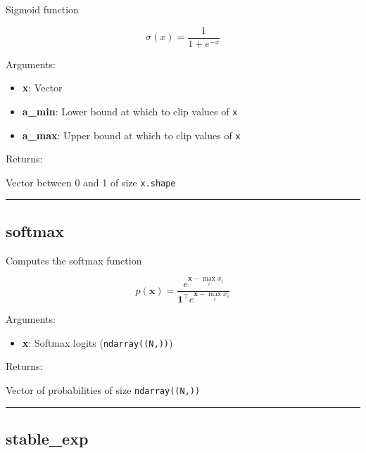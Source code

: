 Sigmoid function

\[
\sigma(x) = \frac{1}{1 + e^{-x}}
\]

Arguments:

\begin{itemize}
\tightlist
\item
  \textbf{x}: Vector
\item
  \textbf{a\_min}: Lower bound at which to clip values of \texttt{x}
\item
  \textbf{a\_max}: Upper bound at which to clip values of \texttt{x}
\end{itemize}

Returns:

Vector between 0 and 1 of size \texttt{x.shape}

\begin{center}\rule{0.5\linewidth}{\linethickness}\end{center}

\hypertarget{softmax}{%
\subsection{softmax}\label{softmax}}

\begin{Shaded}
\begin{Highlighting}[]
\end{Highlighting}
\end{Shaded}

Computes the softmax function

\[
p(\mathbf{x}) = \frac{e^{\mathbf{x} - \max_i x_i}}{\mathbf{1}^\top e^{\mathbf{x} - \max_i x_i}}
\]

Arguments:

\begin{itemize}
\tightlist
\item
  \textbf{x}: Softmax logits (\texttt{ndarray((N,))})
\end{itemize}

Returns:

Vector of probabilities of size \texttt{ndarray((N,))}

\begin{center}\rule{0.5\linewidth}{\linethickness}\end{center}

\hypertarget{stable_exp}{%
\subsection{stable\_exp}\label{stable_exp}}

